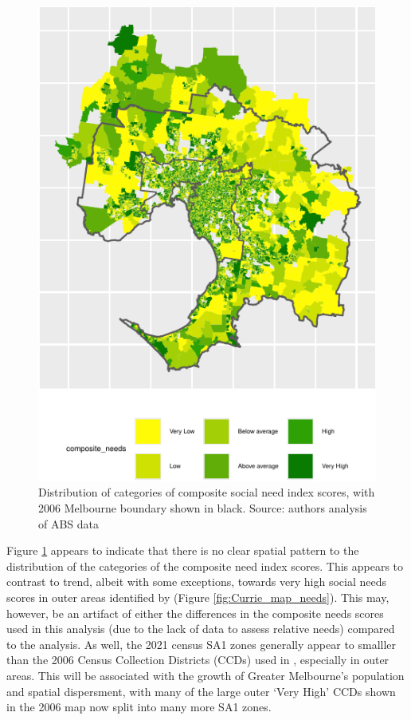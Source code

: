 \documentclass[preprint, 3p,
authoryear]{elsarticle} %
\begin{document}
\begin{figure}
\includegraphics[width=0.9\linewidth]{Leveraging_GTFS_to_assess_transit_supply_Transport_Geography_files/figure-latex/Greater_Melbourne_2021_social_needs-1} \caption{Distribution of categories of composite social need index scores, with 2006 Melbourne boundary shown in black. Source: authors analysis of ABS data}\label{fig:Greater_Melbourne_2021_social_needs}
\end{figure}

Figure \ref{fig:Greater_Melbourne_2021_social_needs} appears to indicate
that there is no clear spatial pattern to the distribution of the
categories of the composite need index scores. This appears to contrast
to trend, albeit with some exceptions, towards very high social needs
scores in outer areas identified by \citet{currie2010identifying}
(Figure \ref{fig:Currie_map_needs}). This may, however, be an artifact
of either the differences in the composite needs scores used in this
analysis (due to the lack of data to assess relative needs) compared to
the \citet{currie2010identifying} analysis. As well, the 2021 census SA1
zones generally appear to smalller than the 2006 Census Collection
Districts (CCDs) used in \citet{currie2010identifying}, especially in
outer areas. This will be associated with the growth of Greater
Melbourne's population and spatial dispersment, with many of the large
outer `Very High' CCDs shown in the 2006 map now split into many more
SA1 zones.
\end{document}
